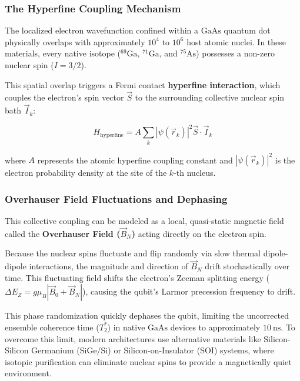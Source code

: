 \documentclass[
]{article}
\begin{document}
\subsubsection{The Hyperfine Coupling
Mechanism}\label{the-hyperfine-coupling-mechanism}

The localized electron wavefunction confined within a \(\text{GaAs}\)
quantum dot physically overlaps with approximately \(10^4\) to \(10^6\)
host atomic nuclei. In these materials, every native isotope
(\(\text{}^{69}\text{Ga}\), \(\text{}^{71}\text{Ga}\), and
\(\text{}^{75}\text{As}\)) possesses a non-zero nuclear spin
(\(I = 3/2\)).

This spatial overlap triggers a Fermi contact \textbf{hyperfine
interaction}, which couples the electron's spin vector \(\vec{S}\) to
the surrounding collective nuclear spin bath \(\vec{I}_k\):

\[H_{\text{hyperfine}} = A \sum_{k} |\psi(\vec{r}_k)|^2 \vec{S} \cdot \vec{I}_k\]

where \(A\) represents the atomic hyperfine coupling constant and
\(|\psi(\vec{r}_k)|^2\) is the electron probability density at the site
of the \(k\)-th nucleus.

\subsubsection{Overhauser Field Fluctuations and
Dephasing}\label{overhauser-field-fluctuations-and-dephasing}

This collective coupling can be modeled as a local, quasi-static
magnetic field called the \textbf{Overhauser Field (\(\vec{B}_N\))}
acting directly on the electron spin.

Because the nuclear spins fluctuate and flip randomly via slow thermal
dipole-dipole interactions, the magnitude and direction of \(\vec{B}_N\)
drift stochastically over time. This fluctuating field shifts the
electron's Zeeman splitting energy
(\(\Delta E_Z = g\mu_B |\vec{B}_0 + \vec{B}_N|\)), causing the qubit's
Larmor precession frequency to drift.

This phase randomization quickly dephases the qubit, limiting the
uncorrected ensemble coherence time (\(T_2^*\)) in native
\(\text{GaAs}\) devices to approximately \(10\ \text{ns}\). To overcome
this limit, modern architectures use alternative materials like
Silicon-Silicon Germanium (\(\text{SiGe/Si}\)) or Silicon-on-Insulator
(SOI) systems, where isotopic purification can eliminate nuclear spins
to provide a magnetically quiet environment.
\end{document}
